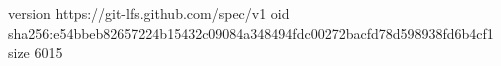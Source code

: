 version https://git-lfs.github.com/spec/v1
oid sha256:e54bbeb82657224b15432c09084a348494fdc00272bacfd78d598938fd6b4cf1
size 6015
